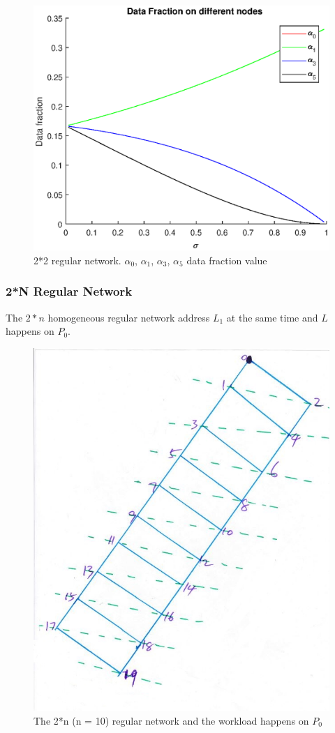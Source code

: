\begin{figure}[!ht]
\centering
\includegraphics[width=1\columnwidth]{figure/2t3fraction.eps}
\caption{2*2 regular network.  $\alpha_{0}$, $\alpha_{1}$, $\alpha_{3}$, $\alpha_{5}$ data fraction value}
\label{fig:2t3fraction}
\end{figure}

\newpage
\subsubsection*{2*N Regular Network}
The $2*n$  homogeneous regular network address $L_{1}$ at the same time and $L$ happens on $P_{0}$.  

\begin{figure}[!ht]
\centering
\includegraphics[width=0.6\columnwidth]{figure/2t10.JPG}
\caption{The 2*n (n = 10) regular network and the workload happens on $P_{0}$}
\label{fig:2t10}
\end{figure}
\newpage

